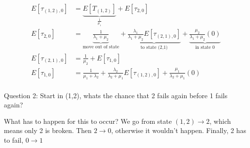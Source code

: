 \documentclass{report}
\begin{document}
{\begin{align*}
	E[\tau_{(1,2), 0}] &= \underbrace{E[T_{(1,2)}]}_{\frac{1}{\mu _{1}}} + E[\tau_{2, 0}]  \\
	E[\tau_{2,0}] &= \underbrace{\frac{1}{\lambda_{1} + \mu _{2}}}_{\text{move out of state}} + \underbrace{\frac{\lambda_{1}}{\lambda_{1} + \mu _{2}}E[\tau_{(2,1), 0 }]}_{\text{to state (2,1)}} + \underbrace{\frac{\mu _{2}}{\lambda_{1} + \mu _{2}} (0)}_{\text{in state 0}} \\
	E[\tau_{(2,1),0}] &= \frac{1}{\mu _{2}} + E[\tau_{1,0}] \\
	E[\tau_{1,0}] &= \frac{1}{\mu _{1} + \lambda_{2}} + \frac{\lambda_{2}}{\lambda_{2} + \mu _{1}} E[\tau_{(1,2), 0}] + \frac{\mu _{1}}{\lambda_{2} + \mu_{1}} (0)  \\
\end{align*}

\vspace{5mm}
Question 2:
Start in (1,2), whats the chance that 2 fails again before 1 fails again? 

What has to happen for this to occur? We go from state $(1,2) \to 2$, which means only 2 is broken. Then $2 \to 0$, otherwise it wouldn't happen. Finally, 2 has to fail, $0 \to1$ 
}


\end{document}
